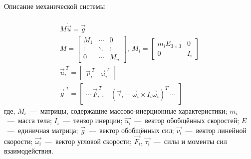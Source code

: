 \begin{frame}[t]{Описание механической системы}
    \framesubtitle{}
    \begin{align}
        M \dot{\vec{u}} = \vec{g}                                \\
        M = \begin{bmatrix}
                M_1    & \cdots & 0      \\
                \vdots & \ddots & \vdots \\
                0      & \cdots & M_n
            \end{bmatrix},\ M_i = \begin{bmatrix}
                                      m_i E_{3\times 3} & 0   \\
                                      0                 & I_i
                                  \end{bmatrix}        \\
        \vec{u}_i^{\ T} = \begin{bmatrix}
                              \vec{v}_i^{\ T} & \vec{\omega}_i^{\ T}
                          \end{bmatrix} \\
        \vec{g}^{\ T} = \begin{bmatrix}
                            \cdots \  \vec{F}_i^{\ T}, & (\vec{\tau}_i - \vec{\omega}_i \times I_i \vec{\omega}_i)^T\  \cdots
                        \end{bmatrix}
    \end{align}
    где, $M_i$~---~матрицы, содержащие массово-инерционные характеристики; $m_i$~---~масса тела; $I_i$~---~тензор инерции; $\vec{u_i}$~---~вектор обобщённых скоростей; $E$~---~единичная матрица; $\vec{g}$~---~вектор обобщённых сил; $\vec{v_i}$~---~вектор линейной скорости; $\vec{\omega_i}$~---~вектор угловой скорости; $\vec{F_i}$, $\vec{\tau_i}$~---~силы и моменты сил взаимодействия.
\end{frame}

